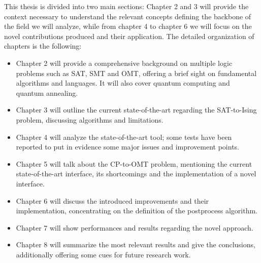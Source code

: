 This thesis is divided into two main sections: Chapter 2 and 3 will provide the context necessary to understand the relevant concepts defining the backbone of the field we will analyze, while from chapter 4 to chapter 6 we will focus on the novel contributions produced and their application. The detailed organization of chapters is the following:

\begin{itemize}
    \item Chapter 2 will provide a comprehensive background on multiple logic problems such as SAT, SMT and OMT, offering a brief sight on fundamental algorithms and languages. It will also cover quantum computing and quantum annealing.
    \item Chapter 3 will outline the current state-of-the-art regarding the SAT-to-Ising problem, discussing algorithms and limitations.
    \item Chapter 4 will analyze the state-of-the-art tool; some tests have been reported to put in evidence some major issues and improvement points.
    \item Chapter 5 will talk about the CP-to-OMT problem, mentioning the current state-of-the-art interface, its shortcomings and the implementation of a novel interface.
    \item Chapter 6 will discuss the introduced improvements and their implementation, concentrating on the definition of the postprocess algorithm.
    \item Chapter 7 will show performances and results regarding the novel approach. 
    \item Chapter 8 will summarize the most relevant results and give the conclusions, additionally offering some cues for future research work.
\end{itemize}

\newpage
